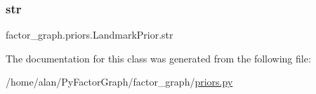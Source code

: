 \mbox{\label{classfactor__graph_1_1priors_1_1LandmarkPrior_abc7f8dec4cb4c66c3985b7b6f1c60e9d}}
\subsubsection{\texorpdfstring{str}{str}}
{\footnotesize\ttfamily factor\+\_\+graph.\+priors.\+Landmark\+Prior.\+str\hspace{0.3cm}{\ttfamily [static]}}



The documentation for this class was generated from the following file\+:\begin{DoxyCompactItemize}
\item
/home/alan/\+Py\+Factor\+Graph/factor\+\_\+graph/\hyperlink{priors_8py}{priors.\+py}\end{DoxyCompactItemize}
